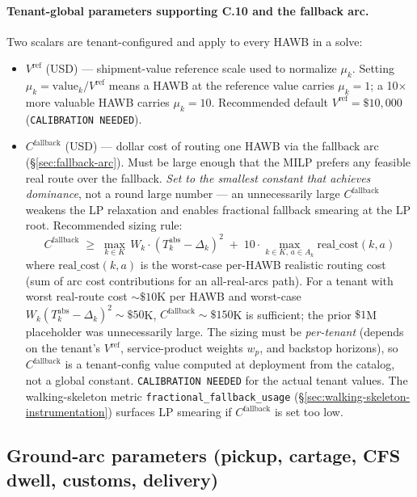 \documentclass[11pt,a4paper]{article}
\theoremstyle{definition}
\begin{document}
\paragraph{Tenant-global parameters supporting C.10 and the fallback arc.}
Two scalars are tenant-configured and apply to every HAWB in a solve:
\begin{itemize}[noitemsep]
  \item $V^{\text{ref}}$ (USD) --- shipment-value reference scale used to
        normalize $\mu_k$. Setting $\mu_k = \text{value}_k / V^{\text{ref}}$
        means a HAWB at the reference value carries $\mu_k = 1$; a 10$\times$
        more valuable HAWB carries $\mu_k = 10$. Recommended default
        $V^{\text{ref}} = \$10{,}000$ (\texttt{CALIBRATION NEEDED}).
  \item $C^{\text{fallback}}$ (USD) --- dollar cost of routing one HAWB via
        the fallback arc (\S\ref{sec:fallback-arc}). Must be large enough
        that the MILP prefers any feasible real route over the fallback.
        \emph{Set to the smallest constant that achieves dominance}, not a
        round large number --- an unnecessarily large $C^{\text{fallback}}$
        weakens the LP relaxation and enables fractional fallback smearing
        at the LP root. Recommended sizing rule:
        \[
          C^{\text{fallback}} \;\geq\; \max_{k \in K}\, W_k \cdot
          (T_k^{\text{abs}} - \Delta_k)^2 \;+\; 10 \cdot \max_{k \in K,\, a \in A_k}
          \text{real\_cost}(k, a)
        \]
        where $\text{real\_cost}(k, a)$ is the worst-case per-HAWB
        realistic routing cost (sum of arc cost contributions for an
        all-real-arcs path). For a tenant with worst real-route cost
        $\sim \$10$K per HAWB and worst-case $W_k (T_k^{\text{abs}} -
        \Delta_k)^2 \sim \$50$K, $C^{\text{fallback}} \sim \$150$K is
        sufficient; the prior $\$1$M placeholder was unnecessarily
        large. The sizing must be \emph{per-tenant} (depends on the
        tenant's $V^{\text{ref}}$, service-product weights $w_p$, and
        backstop horizons), so $C^{\text{fallback}}$ is a tenant-config
        value computed at deployment from the catalog, not a global
        constant. \texttt{CALIBRATION NEEDED} for the actual tenant
        values. The walking-skeleton metric
        \texttt{fractional\_fallback\_usage} (\S\ref{sec:walking-skeleton-instrumentation})
        surfaces LP smearing if $C^{\text{fallback}}$ is set too low.
\end{itemize}

\subsection{Ground-arc parameters (pickup, cartage, CFS dwell, customs, delivery)}
\label{sec:ground-arc-params}
\end{document}
